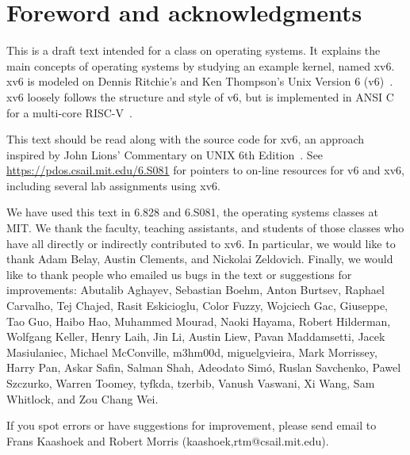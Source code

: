 \chapter*{Foreword and acknowledgments}


This is a draft text intended for a class on operating systems. It
explains the main concepts of operating systems by studying an example
kernel, named xv6.  xv6 is modeled on Dennis Ritchie's and
Ken Thompson's Unix Version 6 (v6)~\cite{unix}.  xv6 loosely follows the structure
and style of v6, but is implemented in ANSI C~\cite{kernighan} for 
a multi-core RISC-V~\cite{riscv}.

This text should be read along with the source code for xv6, an approach 
inspired by John Lions' Commentary on UNIX 6th Edition~\cite{lions}. See
\url{https://pdos.csail.mit.edu/6.S081} for pointers to on-line
resources for v6 and xv6, including several lab assignments
using xv6.

We have used this text in 6.828 and 6.S081, the operating systems
classes at MIT.  We thank the faculty, teaching assistants, and
students of those classes who have all directly or indirectly
contributed to xv6.  In particular, we would like to thank Adam Belay,
Austin Clements, and Nickolai Zeldovich.  Finally, we would like to
thank people who emailed us bugs in the text or suggestions for
improvements: Abutalib Aghayev, Sebastian Boehm, Anton Burtsev,
Raphael Carvalho, Tej Chajed, Rasit Eskicioglu, Color Fuzzy, Wojciech
Gac, Giuseppe, Tao Guo, Haibo Hao, Muhammed Mourad, Naoki Hayama,
Robert Hilderman, Wolfgang Keller, Henry Laih, Jin Li, Austin Liew,
Pavan Maddamsetti, Jacek Masiulaniec, Michael McConville, m3hm00d,
miguelgvieira, Mark Morrissey, Harry Pan, Askar Safin, Salman Shah,
Adeodato Simó, Ruslan Savchenko, Pawel Szczurko, Warren Toomey,
tyfkda, tzerbib, Vanush Vaswani, Xi Wang, Sam Whitlock, and Zou Chang
Wei.

If you spot errors or have suggestions for improvement, please send email to
Frans Kaashoek and Robert Morris (kaashoek,rtm@csail.mit.edu).
